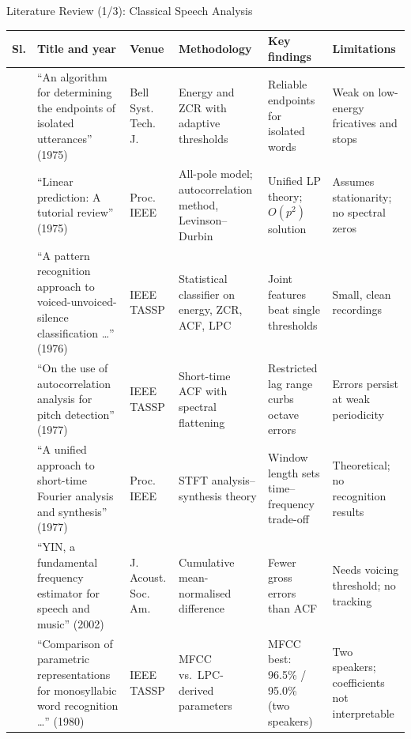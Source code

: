 \documentclass[aspectratio=169,10pt,xcolor=table]{beamer}
\newcommand{\lrfont}{\fontsize{7.0}{8.1}\selectfont}
\newcommand{\lrhead}{\rowcolor{hdrEdge}\textbf{Sl.} & \textbf{Title and year} & \textbf{Venue} & \textbf{Methodology} & \textbf{Key findings} & \textbf{Limitations}\\ \midrule}
\begin{document}
\begin{frame}{Literature Review (1/3): Classical Speech Analysis}
\lrfont
\begin{tabularx}{\linewidth}{@{}c L{3.75cm} L{1.4cm} Y Y Y@{}}
\toprule
\lrhead
\cite{rabiner1975endpoints} & ``An algorithm for determining the endpoints of isolated utterances'' (1975) & Bell Syst. Tech. J. & Energy and ZCR with adaptive thresholds & Reliable endpoints for isolated words & Weak on low-energy fricatives and stops\\
\cite{makhoul1975lp} & ``Linear prediction: A tutorial review'' (1975) & Proc. IEEE & All-pole model; autocorrelation method, Levinson--Durbin & Unified LP theory; $O(p^2)$ solution & Assumes stationarity; no spectral zeros\\
\cite{atal1976vus} & ``A pattern recognition approach to voiced-unvoiced-silence classification \ldots'' (1976) & IEEE TASSP & Statistical classifier on energy, ZCR, ACF, LPC & Joint features beat single thresholds & Small, clean recordings\\
\cite{rabiner1977pitch} & ``On the use of autocorrelation analysis for pitch detection'' (1977) & IEEE TASSP & Short-time ACF with spectral flattening & Restricted lag range curbs octave errors & Errors persist at weak periodicity\\
\cite{allen1977stft} & ``A unified approach to short-time Fourier analysis and synthesis'' (1977) & Proc. IEEE & STFT analysis--synthesis theory & Window length sets time--frequency trade-off & Theoretical; no recognition results\\
\cite{decheveigne2002yin} & ``YIN, a fundamental frequency estimator for speech and music'' (2002) & J. Acoust. Soc. Am. & Cumulative mean-normalised difference & Fewer gross errors than ACF & Needs voicing threshold; no tracking\\
\cite{davis1980mfcc} & ``Comparison of parametric representations for monosyllabic word recognition \ldots'' (1980) & IEEE TASSP & MFCC vs.\ LPC-derived parameters & MFCC best: 96.5\% / 95.0\% (two speakers) & Two speakers; coefficients not interpretable\\
\bottomrule
\end{tabularx}
\end{frame}
\end{document}
